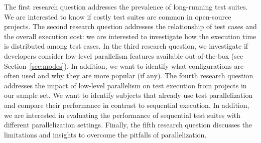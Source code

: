 The first research question addresses the prevalence of long-running
test suites. We are interested to know if costly test suites are
common in open-source projects.  The second research question
addresses the relationship of test cases and the overall execution
cost: we are interested to investigate how the execution time is
distributed among test cases.  In the third research question, we
investigate if developers consider low-level parallelism features
available out-of-the-box (see Section~\ref{sec:modes}). In addition,
we want to identify what configurations are often used and why they
are more popular (if any).  The fourth research question addresses the
impact of low-level parallelism on test execution from projects in our
sample set. We want to identify subjects that already use test
parallelization and compare their performance in contrast to
sequential execution. In addition, we are interested in evaluating the
performance of sequential test suites with different parallelization
settings.
Finally, the fifth research question discusses the limitations and
insights to overcome the pitfalls of parallelization.


